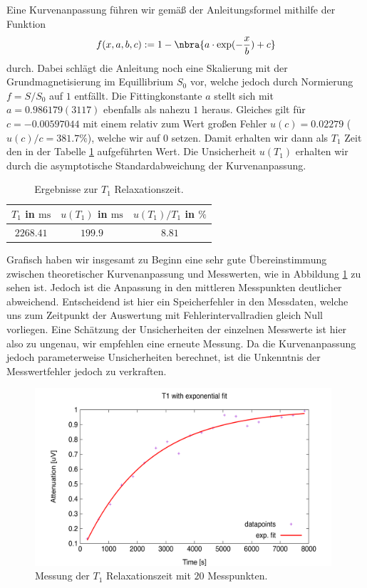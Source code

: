 \documentclass[../Zusammenfassung/main.tex]{subfiles}
\begin{document}
    Eine Kurvenanpassung führen wir gemäß der Anleitungsformel mithilfe der Funktion 
    \[
        f(x,a,b,c) := 1 - \nbra{a\cdot\exp(-\frac{x}{b}) + c}
    \]
    durch. Dabei schlägt die Anleitung noch eine Skalierung mit der Grundmagnetisierung im Equillibrium $S_0$ vor, welche jedoch durch Normierung $f = S/S_0$ auf $1$ entfällt. Die Fittingkonstante $a$ stellt sich mit $a = 0.986179(3117)$ ebenfalls als nahezu $1$ heraus. Gleiches gilt für $c = -0.00597044$ mit einem relativ zum Wert großen Fehler $u(c) = 0.02279$ ($u(c)/c = 381.7\si{\percent}$), welche wir auf $0$ setzen. Damit erhalten wir dann als $T_1$ Zeit den in der Tabelle \ref{tab:8:T1} aufgeführten Wert. Die Unsicherheit $u(T_1)$ erhalten wir durch die asymptotische Standardabweichung der Kurvenanpassung. 

    \begin{table}[H]
        \centering
        \begin{tabular}{c|cc}
            \hline
            $T_1$ in $\si{\ms}$ & $u(T_1)$ in $\si{\ms}$ & $u(T_1)/T_1$ in $\si{\percent}$ \\
            \hline\hline
            $2268.41$ & $199.9$ & $8.81$ \\
            \hline
        \end{tabular}
        \caption{Ergebnisse zur $T_1$ Relaxationszeit.}
        \label{tab:8:T1}
    \end{table}
    Grafisch haben wir insgesamt zu Beginn eine sehr gute Übereinstimmung zwischen theoretischer Kurvenanpassung und Messwerten, wie in Abbildung \ref{fig:8:T1-Bp-20steps_exp} zu sehen ist. Jedoch ist die Anpassung in den mittleren Messpunkten deutlicher abweichend. Entscheidend ist hier ein Speicherfehler in den Messdaten, welche uns zum Zeitpunkt der Auswertung mit Fehlerintervallradien gleich Null vorliegen. Eine Schätzung der Unsicherheiten der einzelnen Messwerte ist hier also zu ungenau, wir empfehlen eine erneute Messung. Da die Kurvenanpassung jedoch parameterweise Unsicherheiten berechnet, ist die Unkenntnis der Messwertfehler jedoch zu verkraften.
    \begin{figure}[H]
        \centering
        \includegraphics[width=11cm]{../Bilddateien/8/T1-Bp-20steps_exp.png}
        \caption{Messung der $T_1$ Relaxationszeit mit $20$ Messpunkten.}
        \label{fig:8:T1-Bp-20steps_exp}
    \end{figure}
\end{document}

